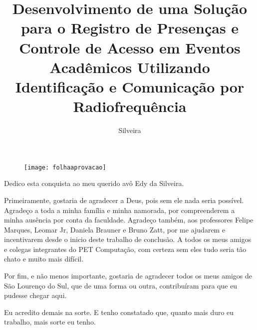\documentclass[tcc,capa]{texufpel}
\title{Desenvolvimento de uma Solução para o Registro de Presenças e Controle de Acesso em Eventos Acadêmicos Utilizando Identificação e Comunicação por Radiofrequência}
\author{Silveira}{Rafael}
\begin{document}

\maketitle 

\sloppy

\begin{figure}
\end{figure}

 \begin{figure}[H]
            \centering \texttt{[image: folhaaprovacao]}
            \label{folhaaprovacao}
        \end{figure}


\begin{dedicatoria}
  Dedico esta conquista ao meu querido avô Edy da Silveira.
\end{dedicatoria}

\begin{agradecimentos}
    Primeiramente, gostaria de agradecer a Deus, pois sem ele nada seria possível.
    Agradeço a toda a minha família e minha namorada, por compreenderem a minha ausência por conta da faculdade. 
    Agradeço também, aos professores Felipe Marques, Leomar Jr, Daniela Brauner e Bruno Zatt, por me ajudarem e incentivarem desde o inicio deste trabalho de conclusão.
    A todos os meus amigos e colegas integrantes do PET Computação, com certeza sem eles tudo seria tão chato e muito mais difícil.
    
    Por fim, e não menos importante, gostaria de agradecer todos os meus amigos de São Lourenço do Sul, que de uma forma ou outra, contribuíram para que eu pudesse chegar aqui.
\end{agradecimentos}

\begin{epigrafe}
Eu acredito demais na sorte. E tenho constatado que, quanto mais duro eu trabalho, mais sorte eu tenho.
\end{epigrafe}

\end{document}
